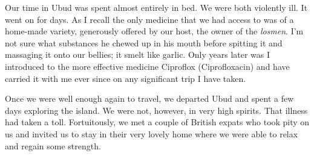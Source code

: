 Our time in Ubud was spent almost entirely in bed. We were both
violently ill. It went on for days. As I recall the only medicine that
we had access to was of a home-made variety, generously offered by our
host, the owner of the \emph{losmen}. I'm not sure what substances he
chewed up in his mouth before spitting it and massaging it onto our
bellies; it smelt like garlic. Only years later was I introduced to the
more effective medicine Ciproflox (Ciprofloxacin) and have carried it with me
ever since on any significant trip I have taken.

Once we were well enough again to travel, we departed Ubud and spent a
few days exploring the island. We were not, however, in very high
spirits. That illness had taken a toll. Fortuitously, we met a couple of
British expats who took pity on us and invited us to stay in their very
lovely home where we were able to relax and regain some strength.

